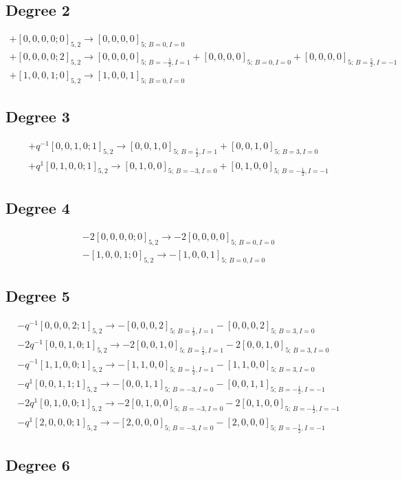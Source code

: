 \documentclass{article}
\begin{document}
\subsection*{Degree 2}
\[\begin{gathered} +[0,0,0,0;0]_{5,2}\longrightarrow [0,0,0,0]_{5;\,B=0,I=0}\\+[0,0,0,0;2]_{5,2}\longrightarrow [0,0,0,0]_{5;\,B=-\frac{5}{2},I=1} +[0,0,0,0]_{5;\,B=0,I=0} +[0,0,0,0]_{5;\,B=\frac{5}{2},I=-1}\\+[1,0,0,1;0]_{5,2}\longrightarrow [1,0,0,1]_{5;\,B=0,I=0}\end{gathered}\]\subsection*{Degree 3}
\[\begin{gathered} +q^{-1}[0,0,1,0;1]_{5,2}\longrightarrow [0,0,1,0]_{5;\,B=\frac{1}{2},I=1} +[0,0,1,0]_{5;\,B=3,I=0}\\+q^{1}[0,1,0,0;1]_{5,2}\longrightarrow [0,1,0,0]_{5;\,B=-3,I=0} +[0,1,0,0]_{5;\,B=-\frac{1}{2},I=-1}\end{gathered}\]\subsection*{Degree 4}
\[\begin{gathered} -2[0,0,0,0;0]_{5,2}\longrightarrow -2[0,0,0,0]_{5;\,B=0,I=0}\\-[1,0,0,1;0]_{5,2}\longrightarrow -[1,0,0,1]_{5;\,B=0,I=0}\end{gathered}\]\subsection*{Degree 5}
\[\begin{gathered} -q^{-1}[0,0,0,2;1]_{5,2}\longrightarrow -[0,0,0,2]_{5;\,B=\frac{1}{2},I=1} -[0,0,0,2]_{5;\,B=3,I=0}\\-2q^{-1}[0,0,1,0;1]_{5,2}\longrightarrow -2[0,0,1,0]_{5;\,B=\frac{1}{2},I=1} -2[0,0,1,0]_{5;\,B=3,I=0}\\-q^{-1}[1,1,0,0;1]_{5,2}\longrightarrow -[1,1,0,0]_{5;\,B=\frac{1}{2},I=1} -[1,1,0,0]_{5;\,B=3,I=0}\\-q^{1}[0,0,1,1;1]_{5,2}\longrightarrow -[0,0,1,1]_{5;\,B=-3,I=0} -[0,0,1,1]_{5;\,B=-\frac{1}{2},I=-1}\\-2q^{1}[0,1,0,0;1]_{5,2}\longrightarrow -2[0,1,0,0]_{5;\,B=-3,I=0} -2[0,1,0,0]_{5;\,B=-\frac{1}{2},I=-1}\\-q^{1}[2,0,0,0;1]_{5,2}\longrightarrow -[2,0,0,0]_{5;\,B=-3,I=0} -[2,0,0,0]_{5;\,B=-\frac{1}{2},I=-1}\end{gathered}\]\subsection*{Degree 6}
\end{document}
